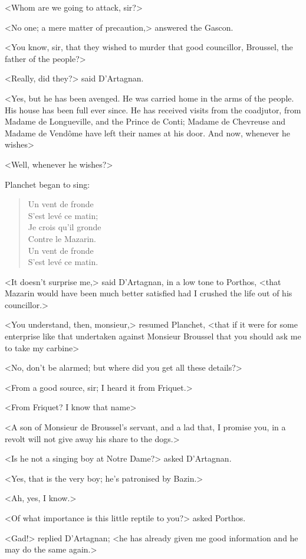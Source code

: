 <Whom are we going to attack, sir?>

<No one; a mere matter of precaution,> answered the Gascon.

<You know, sir, that they wished to murder that good councillor, Broussel, the father of the people?>

<Really, did they?> said D'Artagnan.

<Yes, but he has been avenged. He was carried home in the arms of the people. His house has been full ever since. He has received visits from the coadjutor, from Madame de Longueville, and the Prince de Conti; Madame de Chevreuse and Madame de Vendôme have left their names at his door. And now, whenever he wishes\longdash>

<Well, whenever he wishes?>

Planchet began to sing:  
\begin{verse}
	Un vent de fronde\\
	S'est levé ce matin;\\
	Je crois qu'il gronde\\
	Contre le Mazarin.\\
	Un vent de fronde\\
	S'est levé ce matin.
\end{verse}

<It doesn't surprise me,> said D'Artagnan, in a low tone to Porthos, <that Mazarin would have been much better satisfied had I crushed the life out of his councillor.>

<You understand, then, monsieur,> resumed Planchet, <that if it were for some enterprise like that undertaken against Monsieur Broussel that you should ask me to take my carbine\longdash>

<No, don't be alarmed; but where did you get all these details?>

<From a good source, sir; I heard it from Friquet.>

<From Friquet? I know that name\longdash>

<A son of Monsieur de Broussel's servant, and a lad that, I promise you, in a revolt will not give away his share to the dogs.>

<Is he not a singing boy at Notre Dame?> asked D'Artagnan.

<Yes, that is the very boy; he's patronised by Bazin.>

<Ah, yes, I know.>

<Of what importance is this little reptile to you?> asked Porthos.

<Gad!> replied D'Artagnan; <he has already given me good information and he may do the same again.>

